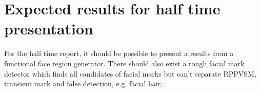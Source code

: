 \section{Expected results for half time presentation}

For the half time report, it should be possible to present a results from a functional face region generator. There should also exist a rough facial mark detector which finds all candidates of facial marks but can't separate RPPVSM, transient mark and false detection, e.g. facial hair. 
    